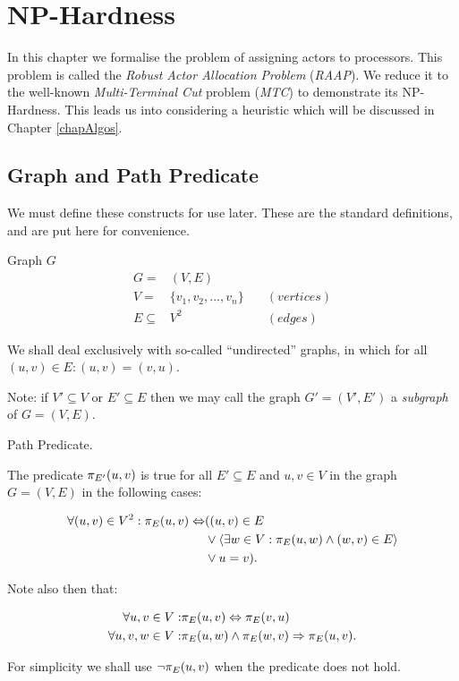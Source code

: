 \chapter{NP-Hardness}
\label{chapHardness}

In this chapter we formalise the problem of assigning actors to processors.
This problem is called the {\em Robust Actor Allocation Problem} ({\em RAAP}).
We reduce it to the well-known {\em Multi-Terminal Cut} problem ({\em MTC}) to demonstrate its NP-Hardness.
This leads us into considering a heuristic which will be discussed in Chapter \ref{chapAlgos}.

\section{Graph and Path Predicate}

We must define these constructs for use later.
These are the standard definitions, and are put here for convenience.

\begin{definition}
Graph $G$
\begin{align}
	\nonumber G = & (V,E) \\
	\nonumber V = & \{v_1, v_2, ..., v_n\} \quad & (vertices)\\
	\nonumber E \subseteq & V^2 & (edges)
\end{align}

We shall deal exclusively with so-called ``undirected'' graphs, in which for all $(u,v) \in E : (u,v) = (v,u)$.

Note: if $V' \subseteq V$ or $E' \subseteq E$ then we may call the graph $G'=(V',E')$ a \emph{subgraph} of $G=(V,E)$.
\end{definition}

\begin{definition}
Path Predicate.

The predicate $\pi_{E'}(u, v)$ is true for all $E' \subseteq E$ and $u, v \in V$ in the graph $G=(V,E)$ in the following cases:

\begin{align}
	\nonumber \forall (u,v) \in V^2 : \pi_{E}(u, v) \Leftrightarrow & ( (u, v) \in E \\
	\nonumber & \vee \langle \exists w \in V : \pi_{E}(u, w) \wedge (w, v) \in E \rangle \\
	\nonumber & \vee u = v ).
\end{align}

Note also then that:

\begin{align}
	\nonumber \forall u, v \in V: & \pi_{E}(u, v) \Leftrightarrow \pi_{E}(v, u) \\
	\nonumber \forall u, v, w \in V: & \pi_{E}(u, w) \wedge \pi_{E}(w, v) \Rightarrow \pi_{E}(u, v).
\end{align}

For simplicity we shall use $\neg\pi_{E}(u, v)$ when the predicate does not hold.

\end{definition}

